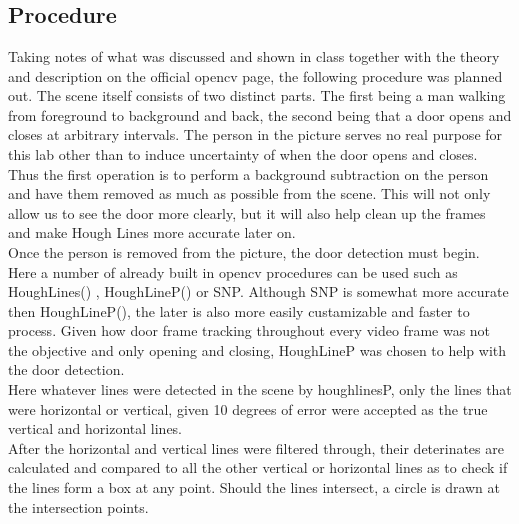 \documentclass{article}
\begin{document}
\begin{lstlisting}




\end{lstlisting}
\subsection{Procedure}\label{sec:intro}
Taking notes of what was discussed and shown in class together with the theory and description on the official opencv page, the following procedure was planned out. 
The scene itself consists of two distinct parts. The first being a man walking from foreground to background and back, the second being that a door opens and closes at arbitrary intervals. The person in the picture serves no real purpose for this lab other than to induce uncertainty of when the door opens and closes. Thus the first operation is to perform a background subtraction on the person and have them removed as much as possible from the scene. This will not only allow us to see the door more clearly, but it will also help clean up the frames and make Hough Lines more accurate later on.\\


Once the person is removed from the picture, the door detection must begin.\\ Here a number of already built in opencv procedures can be used such as HoughLines() , HoughLineP() or SNP. Although SNP is somewhat more accurate then HoughLineP(), the later is also more easily custamizable and faster to process. Given how door frame tracking throughout every video frame was not the objective and only opening and closing, HoughLineP was chosen to help with the door detection. \\
Here whatever lines were detected in the scene by houghlinesP, only the lines that were horizontal or vertical, given 10 degrees of error were accepted as the true vertical and horizontal lines.\\
After the horizontal and vertical lines were filtered through, their deterinates are calculated and compared to all the other vertical or horizontal lines as to check if the lines form a box at any point. Should the lines intersect, a circle is drawn at the intersection points.
\end{document}
